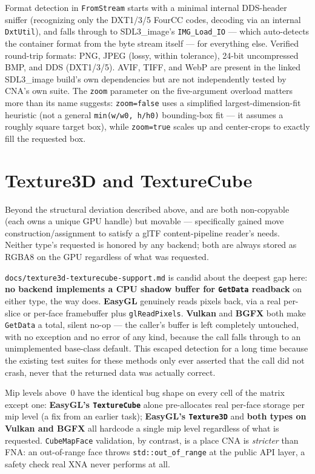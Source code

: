 Format detection in \texttt{FromStream} starts with a minimal internal DDS-header sniffer
(recognizing only the DXT1/3/5 FourCC codes, decoding via an internal \texttt{DxtUtil}), and
falls through to SDL3\_image's \texttt{IMG\_Load\_IO} --- which auto-detects the container
format from the byte stream itself --- for everything else. Verified round-trip formats:
PNG, JPEG (lossy, within tolerance), 24-bit uncompressed BMP, and DDS (DXT1/3/5). AVIF, TIFF,
and WebP are present in the linked SDL3\_image build's own dependencies but are not
independently tested by CNA's own suite. The \texttt{zoom} parameter on the five-argument
overload matters more than its name suggests: \texttt{zoom=false} uses a simplified
largest-dimension-fit heuristic (not a general \texttt{min(w/w0, h/h0)} bounding-box fit --- it
assumes a roughly square target box), while \texttt{zoom=true} scales up and center-crops to
exactly fill the requested box.

\section{Texture3D and TextureCube}

Beyond the structural deviation described above,  and
 are both non-copyable (each owns a unique GPU handle) but movable ---
 specifically gained move construction/assignment to satisfy a glTF
content-pipeline reader's needs. Neither type's requested  is honored
by any backend; both are always stored as RGBA8 on the GPU regardless of what was requested.

\texttt{docs/texture3d-texturecube-support.md} is candid about the deepest gap here:
\textbf{no backend implements a CPU shadow buffer for \texttt{GetData} readback} on either
type, the way  does. \textbf{EasyGL} genuinely reads pixels back, via a
real per-slice or per-face framebuffer plus \texttt{glReadPixels}. \textbf{Vulkan} and
\textbf{BGFX} both make \texttt{GetData} a total, silent no-op --- the caller's buffer is
left completely untouched, with no exception and no error of any kind, because the call falls
through to an unimplemented base-class default. This escaped detection for a long time
because the existing test suites for these methods only ever asserted that the call did not
crash, never that the returned data was actually correct.

Mip levels above~0 have the identical bug shape on every cell of the matrix except one:
\textbf{EasyGL's \texttt{TextureCube}} alone pre-allocates real per-face storage per mip
level (a fix from an earlier task); \textbf{EasyGL's \texttt{Texture3D}} and \textbf{both
types on Vulkan and BGFX} all hardcode a single mip level regardless of what is requested.
\texttt{CubeMapFace} validation, by contrast, is a place CNA is \emph{stricter} than FNA: an
out-of-range face throws \texttt{std::out\_of\_range} at the public API layer, a safety check
real XNA never performs at all.

